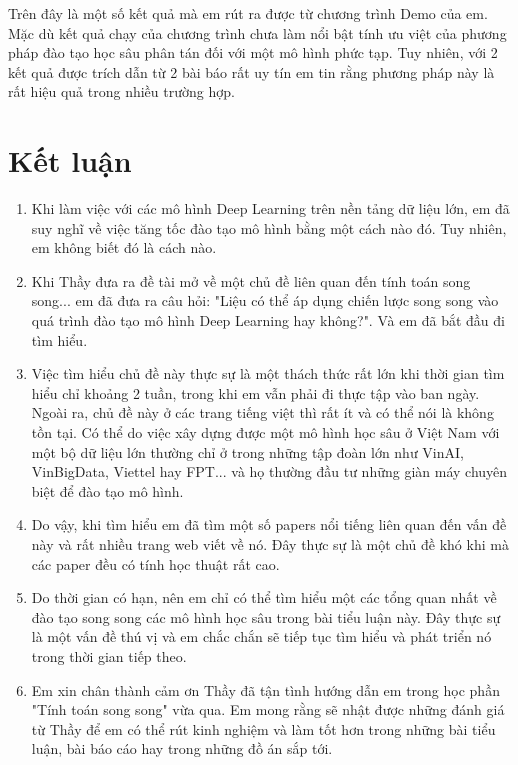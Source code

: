 \documentclass[11pt,a4paper]{article}
\numberwithin{equation}{subsection}
\numberwithin{figure}{subsection}
\numberwithin{table}{subsection}
\begin{document}
Trên đây là một số kết quả mà em rút ra được từ chương trình Demo của em. Mặc dù kết quả chạy của chương trình chưa làm nổi bật tính ưu việt của phương pháp đào tạo học sâu phân tán đối với một mô hình phức tạp. Tuy nhiên, với 2 kết quả được trích dẫn từ 2 bài báo rất uy tín em tin rằng phương pháp này là rất hiệu quả trong nhiều trường hợp.



\newpage
\section{Kết luận}
\begin{enumerate}[-]
	\item Khi làm việc với các mô hình Deep Learning trên nền tảng dữ liệu lớn, em đã suy nghĩ về việc tăng tốc đào tạo mô hình bằng một cách nào đó. Tuy nhiên, em không biết đó là cách nào.
	\item Khi Thầy đưa ra đề tài mở về một chủ đề liên quan đến tính toán song song... em đã đưa ra câu hỏi: "Liệu có thể áp dụng chiến lược song song vào quá trình đào tạo mô hình Deep Learning hay không?". Và em đã bắt đầu đi tìm hiểu.
	\item Việc tìm hiểu chủ đề này thực sự là một thách thức rất lớn khi thời gian tìm hiểu chỉ khoảng 2 tuần, trong khi em vẫn phải đi thực tập vào ban ngày. Ngoài ra, chủ đề này ở các trang tiếng việt thì rất ít và có thể nói là không tồn tại. Có thể do việc xây dựng được một mô hình học sâu ở Việt Nam với một bộ dữ liệu lớn thường chỉ ở trong những tập đoàn lớn như VinAI, VinBigData, Viettel hay FPT... và họ thường đầu tư những giàn máy chuyên biệt để đào tạo mô hình.
	\item Do vậy, khi tìm hiểu em đã tìm một số papers nổi tiếng liên quan đến vấn đề này và rất nhiều trang web viết về nó. Đây thực sự là một chủ đề khó khi mà các paper đều có tính học thuật rất cao.
	\item Do thời gian có hạn, nên em chỉ có thể tìm hiểu một các tổng quan nhất về đào tạo song song các mô hình học sâu trong bài tiểu luận này. Đây thực sự là một vấn đề thú vị và em chắc chắn sẽ tiếp tục tìm hiểu và phát triển nó trong thời gian tiếp theo.
	\item Em xin chân thành cảm ơn Thầy đã tận tình hướng dẫn em trong học phần "Tính toán song song" vừa qua. Em mong rằng sẽ nhật được những đánh giá từ Thầy để em có thể rút kinh nghiệm và làm tốt hơn trong những bài tiểu luận, bài báo cáo hay trong những đồ án sắp tới.
\end{enumerate}
\end{document}
